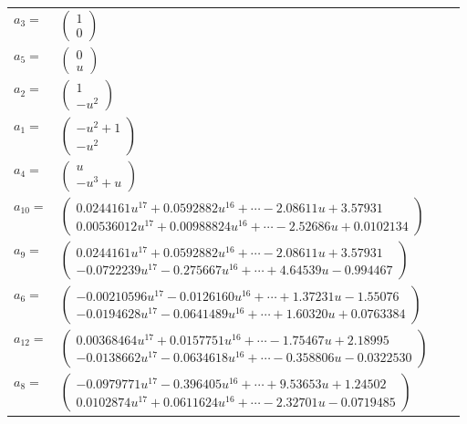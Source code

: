 \documentclass[1p]{elsarticle_modified}
\theoremstyle{definition}
\begin{document}
\begin{tabular}{m{7pt} m{180pt} m{7pt} m{180pt} }
\flushright $a_{3}=$&$\begin{pmatrix}1\\0\end{pmatrix}$ \\
\flushright $a_{5}=$&$\begin{pmatrix}0\\u\end{pmatrix}$ \\
\flushright $a_{2}=$&$\begin{pmatrix}1\\- u^2\end{pmatrix}$ \\
\flushright $a_{1}=$&$\begin{pmatrix}- u^2+1\\- u^2\end{pmatrix}$ \\
\flushright $a_{4}=$&$\begin{pmatrix}u\\- u^3+u\end{pmatrix}$ \\
\flushright $a_{10}=$&$\begin{pmatrix}0.0244161 u^{17}+0.0592882 u^{16}+\cdots-2.08611 u+3.57931\\0.00536012 u^{17}+0.00988824 u^{16}+\cdots-2.52686 u+0.0102134\end{pmatrix}$ \\
\flushright $a_{9}=$&$\begin{pmatrix}0.0244161 u^{17}+0.0592882 u^{16}+\cdots-2.08611 u+3.57931\\-0.0722239 u^{17}-0.275667 u^{16}+\cdots+4.64539 u-0.994467\end{pmatrix}$ \\
\flushright $a_{6}=$&$\begin{pmatrix}-0.00210596 u^{17}-0.0126160 u^{16}+\cdots+1.37231 u-1.55076\\-0.0194628 u^{17}-0.0641489 u^{16}+\cdots+1.60320 u+0.0763384\end{pmatrix}$ \\
\flushright $a_{12}=$&$\begin{pmatrix}0.00368464 u^{17}+0.0157751 u^{16}+\cdots-1.75467 u+2.18995\\-0.0138662 u^{17}-0.0634618 u^{16}+\cdots-0.358806 u-0.0322530\end{pmatrix}$ \\
\flushright $a_{8}=$&$\begin{pmatrix}-0.0979771 u^{17}-0.396405 u^{16}+\cdots+9.53653 u+1.24502\\0.0102874 u^{17}+0.0611624 u^{16}+\cdots-2.32701 u-0.0719485\end{pmatrix}$ \\

\end{tabular}
\end{document}
